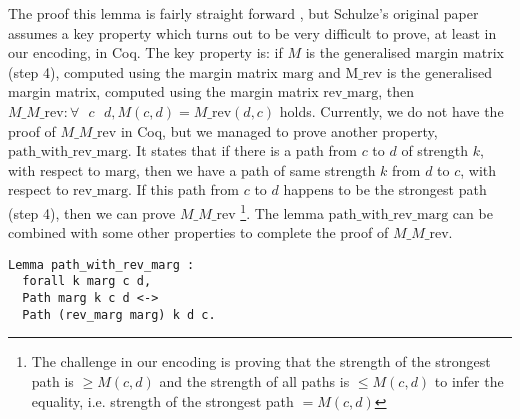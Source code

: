 \documentclass[compsoc,conference,a4paper,10pt,times]{IEEEtran}
\begin{document}
\noindent
The proof this lemma is fairly straight forward \cite{Schulze:2011:NMC}, but 
Schulze's original paper assumes a key property which turns out to be very difficult to prove, 
at least in our encoding, in Coq. The key property is: if $M$ 
is the generalised margin 
matrix (step 4), computed using the margin matrix $\mathrm{marg}$
and $\mathrm{M\_rev}$ is the generalised 
margin matrix, computed using the margin matrix $\mathrm{rev\_marg}$, then 
$M\_M\_\mathrm{rev}: \forall \text{ } c \text{ } d,  M(c, d) =
M\_\mathrm{rev} (d, c)$ holds. Currently, 
we do not have the proof of $M\_M\_\mathrm{rev}$ in Coq, but we managed to prove 
another property, $\mathrm{path\_with\_rev\_marg}$.  
It states that if there is a path from 
$c$ to $d$ of strength $k$, with respect to $\mathrm{marg}$, then we have 
a path of same strength $k$ from $d$ to $c$, with respect to
$\mathrm{rev\_marg}$. 
If this path from $c$ to $d$ happens to be the strongest path (step 4), 
then we can prove $M\_M\_\mathrm{rev}$ \footnote{The challenge in our encoding 
is proving that the strength of the strongest path is $\geq  M(c, d)$ and 
the strength of all paths is $\leq M(c, d)$ to infer the equality, 
i.e. strength of the strongest path $= M(c, d)$}.  The lemma $\mathrm{path\_with\_rev\_marg}$ can be 
combined with 
some other properties to complete the proof of $M\_M\_\mathrm{rev}$. 

\begin{verbatim}
Lemma path_with_rev_marg :
  forall k marg c d,
  Path marg k c d <->  
  Path (rev_marg marg) k d c.

\end{verbatim}








\end{document}
